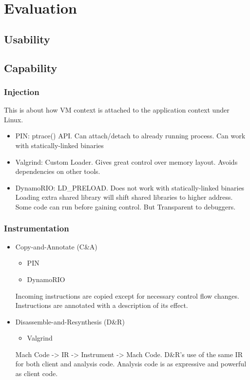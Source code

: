\section{Evaluation}
\label{sec:evaluation}
\subsection{Usability}
\subsection{Capability}
\subsubsection{Injection}
This is about how VM context is attached to the application context under Linux.
\begin{itemize}
	\item PIN: ptrace() API.
	Can attach/detach to already running process.
	Can work with statically-linked binaries
	\item Valgrind: Custom Loader.
	Gives great control over memory layout.
	Avoids dependencies on other tools.
	\item DynamoRIO: LD\_PRELOAD.
	Does not work with statically-linked binaries
	Loading extra shared library will shift shared libraries to higher address.
	Some code can run before gaining control.
	But Transparent to debuggers.
\end{itemize}
\subsubsection{Instrumentation}
\begin{itemize}
	\item Copy-and-Annotate (C\&A)
	\begin{itemize}
		\item PIN 
		\item DynamoRIO
	\end{itemize}
	Incoming instructions are copied except for necessary control flow changes.
	Instructions are annotated with a description of its effect.
	\item Disassemble-and-Resynthesis (D\&R)
	\begin{itemize}
		\item Valgrind
	\end{itemize}
	Mach Code -> IR -> Instrument -> Mach Code.
	D\&R's  use of the same IR for both client and analysis code.
	Analysis code is as expressive and powerful as client code. 
\end{itemize}
